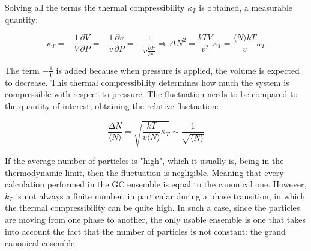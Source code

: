 Solving all the terms the thermal compressibility $\kappa_T$ is obtained, a measurable quantity:

$$\kappa_T = -\frac{1}{V}\frac{\partial V}{\partial P} = -\frac{1}{v}\frac{\partial v}{\partial P} = -\frac{1}{v\frac{\partial P}{\partial v}}\Rightarrow\Delta N^2 = \frac{kTV}{v^2}\kappa_T = \frac{\langle N\rangle kT}{v}\kappa_T$$

The term $ -\frac{1}{V}$ is added because when pressure is applied, the volume is expected to decrease.
This thermal compressibility determines how much the system is compressible with respect to pressure.
The fluctuation needs to be compared to the quantity of interest, obtaining the relative fluctuation:

$$\frac{\Delta N}{\langle N\rangle} = \sqrt{\frac{kT}{v\langle N\rangle}\kappa_T}\sim\frac{1}{\sqrt{\langle N\rangle}}$$

If the average number of particles is "high", which it usually is, being in the thermodynamic limit, then the fluctuation is negligible.
Meaning that every calculation performed in the GC ensemble is equal to the canonical one.
However, $k_T$ is not always a finite number, in particular during a phase transition, in which the thermal compressibility can be quite high.
In such a case, since the particles are moving from one phase to another, the only usable ensemble is one that takes into account the fact that the number of particles is not constant: the grand canonical ensemble.

